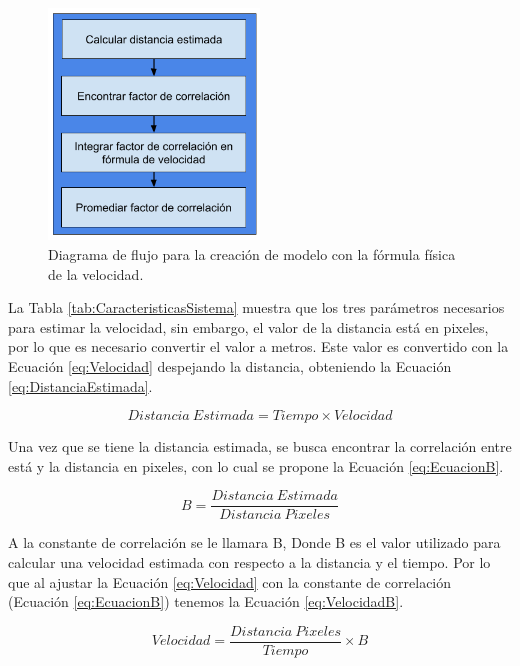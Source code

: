 \begin{figure}[H]
    \centering
    \includegraphics[width=0.5\textwidth]{Metodologia/imgs/DFCrearModeloCustom.png}
    \caption{Diagrama de flujo para la creación de modelo con la fórmula física de la velocidad.}
    \label{fig:CrearModeloCustom}
\end{figure}

La Tabla \ref{tab:CaracteristicasSistema} muestra que los tres parámetros necesarios para estimar la velocidad, sin embargo, el valor de la distancia está en pixeles, por lo que es necesario convertir el valor a metros. Este valor es convertido con la Ecuación \ref{eq:Velocidad} despejando la distancia, obteniendo la  Ecuación \ref{eq:DistanciaEstimada}.

\begin{equation}
    \label{eq:DistanciaEstimada}
    Distancia\:Estimada = Tiempo \times Velocidad
\end{equation}

Una vez que se tiene la distancia estimada, se busca encontrar la correlación entre está y la distancia en pixeles, con lo cual se propone la Ecuación \ref{eq:EcuacionB}.

\begin{equation}
    \label{eq:EcuacionB}
    B = \frac{Distancia \: Estimada}{Distancia \: Pixeles}
\end{equation}

A la constante de correlación se le llamara B, Donde B es el valor utilizado para calcular una velocidad estimada con respecto a la distancia y el tiempo. Por lo que al ajustar la Ecuación \ref{eq:Velocidad} con la constante de correlación (Ecuación \ref{eq:EcuacionB}) tenemos la Ecuación \ref{eq:VelocidadB}.

\begin{equation}
    \label{eq:VelocidadB}
    Velocidad = \frac{Distancia \: Pixeles}{Tiempo} \times B
\end{equation}

